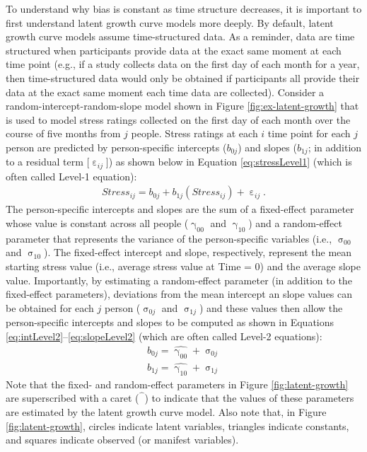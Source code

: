 \documentclass[
12pt, %
twoside,
english]{guelphthesis}
\begin{document}
To understand why bias is constant as time structure decreases, it is important to first understand latent growth curve models more deeply. By default, latent growth curve models assume time-structured data. As a reminder, data are time structured when participants provide data at the exact same moment at each time point (e.g., if a study collects data on the first day of each month for a year, then time-structured data would only be obtained if participants all provide their data at the exact same moment each time data are collected). Consider a random-intercept-random-slope model shown in Figure \ref{fig:ex-latent-growth} that is used to model stress ratings collected on the first day of each month over the course of five months from \(j\) people. Stress ratings at each \(i\) time point for each \(j\) person are predicted by person-specific intercepts (\(b_{0j}\)) and slopes (\(b_{1j}\); in addition to a residual term {[}\(\upepsilon_{ij}\){]}) as shown below in Equation \ref{eq:stressLevel1} (which is often called Level-1 equation):
\begin{align}
  Stress_{ij} = b_{0j} + b_{1j}(Stress_{ij}) + \upepsilon_{ij}.
  \label{eq:stressLevel1}
\end{align}
\noindent The person-specific intercepts and slopes are the sum of a fixed-effect parameter whose value is constant across all people (\(\upgamma_{00}\) and \(\upgamma_{10}\)) and a random-effect parameter that represents the variance of the person-specific variables (i.e., \(\upsigma_{00}\) and \(\upsigma_{10}\)). The fixed-effect intercept and slope, respectively, represent the mean starting stress value (i.e., average stress value at Time = 0) and the average slope value. Importantly, by estimating a random-effect parameter (in addition to the fixed-effect parameters), deviations from the mean intercept an slope values can be obtained for each \(j\) person (\(\upsigma_{0j}\) and \(\upsigma_{1j}\)) and these values then allow the person-specific intercepts and slopes to be computed as shown in Equations \ref{eq:intLevel2}--\ref{eq:slopeLevel2} (which are often called Level-2 equations):
\begin{align}
  b_{0j} = \hat{\upgamma_{00}} + \upsigma_{0j} \label{eq:intLevel2} \\
  b_{1j} = \hat{\upgamma_{10}} + \upsigma_{1j} \label{eq:slopeLevel2}
\end{align}
\noindent Note that the fixed- and random-effect parameters in Figure \ref{fig:latent-growth} are superscribed with a caret (\(\hat{\phantom{\beta}}\)) to indicate that the values of these parameters are estimated by the latent growth curve model. Also note that, in Figure \ref{fig:latent-growth}, circles indicate latent variables, triangles indicate constants, and squares indicate observed (or manifest variables).
\end{document}
